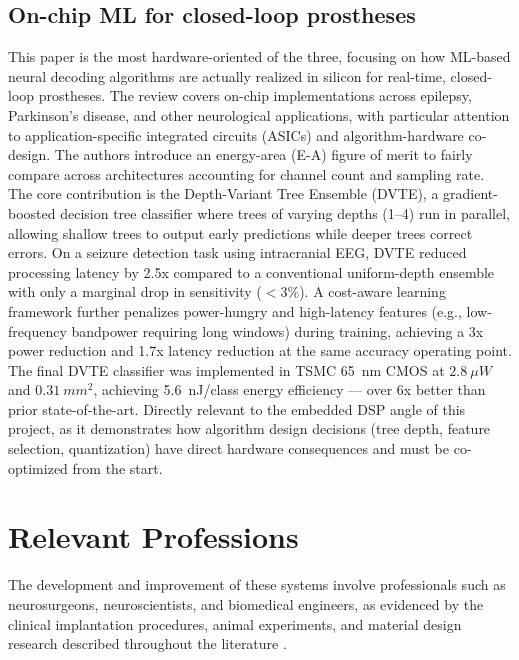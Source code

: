 \documentclass[11pt]{article}
\begin{document}
\subsection*{On-chip ML for closed-loop prostheses \cite{zhu2021closedloop}}
This paper is the most hardware-oriented of the three, focusing on how ML-based
neural decoding algorithms are actually realized in silicon for real-time,
closed-loop prostheses. The review covers on-chip implementations across
epilepsy, Parkinson's disease, and other neurological applications, with
particular attention to application-specific integrated circuits (ASICs) and
algorithm-hardware co-design. The authors introduce an energy-area (E-A) figure
of merit to fairly compare across architectures accounting for channel count and
sampling rate. The core contribution is the Depth-Variant Tree Ensemble (DVTE),
a gradient-boosted decision tree classifier where trees of varying depths (1--4)
run in parallel, allowing shallow trees to output early predictions while deeper
trees correct errors. On a seizure detection task using intracranial EEG, DVTE
reduced processing latency by 2.5x compared to a conventional uniform-depth
ensemble with only a marginal drop in sensitivity ($<$3\%). A cost-aware learning
framework further penalizes power-hungry and high-latency features (e.g.,
low-frequency bandpower requiring long windows) during training, achieving a 3x
power reduction and 1.7x latency reduction at the same accuracy operating point.
The final DVTE classifier was implemented in TSMC 65~nm CMOS at $2.8~\mu W$
and $0.31~mm^2$, achieving 5.6~nJ/class energy efficiency --- over 6x better than
prior state-of-the-art. Directly relevant to the embedded DSP angle of this
project, as it demonstrates how algorithm design decisions (tree depth, feature
selection, quantization) have direct hardware consequences and must be
co-optimized from the start.

\section{Relevant Professions}

The development and improvement of these systems involve professionals such as
neurosurgeons, neuroscientists, and biomedical engineers, as evidenced by the
clinical implantation procedures, animal experiments, and material design
research described throughout the literature \cite{gao2025biocompat}.
\end{document}
